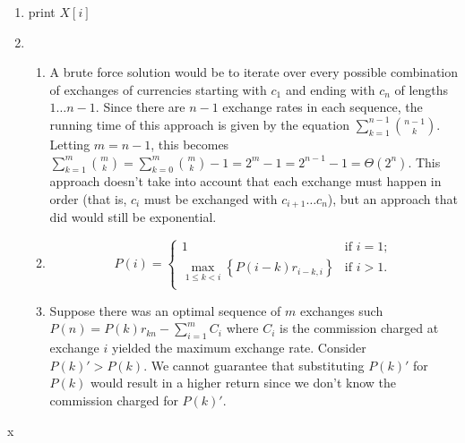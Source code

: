 \documentclass[11pt]{article}
\begin{document}
\begin{enumerate}[label=\bfseries Question \arabic*:]
\item
  \begin{algorithm}
    \begin{algorithmic}
        \State
      \Return\EndIf
      \State{} \State print
      $X\left[i\right]$
      \State
       \Else \State
      \EndIf
      \EndProcedure
    \end{algorithmic}
  \end{algorithm}
\item
  \begin{enumerate}
  \item A brute force solution would be to iterate over every possible
    combination of exchanges of currencies starting with \(c_1\)
    and ending with \(c_n\)
    of lengths \(1 \dots n-1\).
    Since there are \(n-1\)
    exchange rates in each sequence, the running time of this approach
    is given by the equation \(\sum_{k=1}^{n-1}{\binom{n-1}{k}}\).
    Letting \(m = n-1\),
    this becomes
    \(\sum_{k=1}^{m}{\binom{m}{k}}=\sum_{k=0}^{m}{\binom{m}{k}}
    -1=2^m-1=2^{n-1}-1=\Theta\left( 2^n\right)\).
    This approach doesn't take into account that each exchange must
    happen in order (that is, \(c_i\)
    must be exchanged with \(c_{i+1} \dots c_{n}\)),
    but an approach that did would still be exponential.
  \item
    \[ P\left(i\right)=\left\{\begin{array}{ll} 1 & \mbox{if $i=1$};
        \\ \max\limits_{1 \leq k <
          i}{\left\{P\left(i-k\right)r_{i-k,i}\right\}} & \mbox{if
          $i > 1$}. \\ \end{array} \right. \]
  \item Suppose there was an optimal sequence of \(m\)
    exchanges such \(P(n) = P(k)r_{kn} - \sum_{i=1}^{m}{C_i}\)
    where \(C_i\)
    is the commission charged at exchange \(i\)
    yielded the maximum exchange rate. Consider \(P(k)' > P(k)\).
    We cannot guarantee that substituting \(P(k)'\)
    for \(P(k)\)
    would result in a higher return since we don't know the commission
    charged for \(P(k)'\).
  \end{enumerate}
                        \end{enumerate}
x
\end{document}
